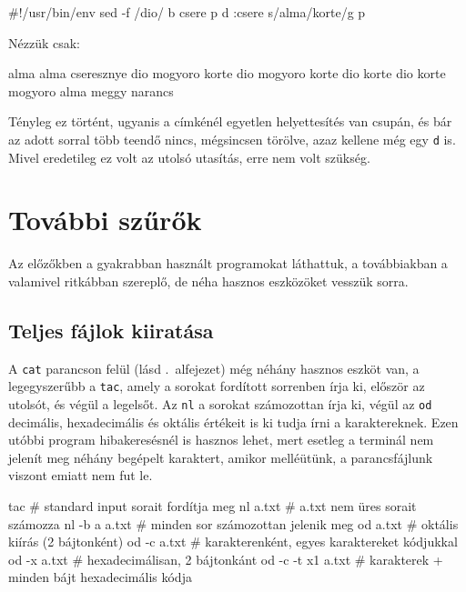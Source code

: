 \begin{VerbExample}
#!/usr/bin/env sed -f
/dio/ b csere
p
d
:csere
{ s/alma/korte/g }
p
\end{VerbExample}

\noindent Nézzük csak:

\begin{VerbExample}
alma alma cseresznye
dio mogyoro korte
dio mogyoro korte
dio korte
dio korte
mogyoro alma meggy narancs
\end{VerbExample}

\noindent Tényleg ez történt, ugyanis a címkénél egyetlen helyettesítés van
csupán, és bár az adott sorral több teendő nincs, mégsincsen törölve, azaz
kellene még egy \texttt{d} is. Mivel eredetileg ez volt az utolsó utasítás, erre
nem volt szükség.



\section{További szűrők}
\label{sec:filters-others}

Az előzőkben a gyakrabban használt programokat láthattuk, a továbbiakban a
valamivel ritkábban szereplő, de néha hasznos eszközöket vesszük sorra.



\subsection{Teljes fájlok kiiratása}

A \texttt{cat} parancson felül (lásd .\ alfejezet) még
néhány hasznos eszköt van, a legegyszerűbb a \texttt{tac}, amely a sorokat
fordított sorrenben írja ki, először az utolsót, és végül a legelsőt. Az
\texttt{nl} a sorokat számozottan írja ki, végül az \texttt{od} decimális,
hexadecimális és oktális értékeit is ki tudja írni a karaktereknek. Ezen utóbbi
program hibakeresésnél is hasznos lehet, mert esetleg a terminál nem jelenít meg
néhány begépelt karaktert, amikor melléütünk, a parancsfájlunk viszont emiatt
nem fut le.

\begin{VerbExample}
tac               # standard input sorait fordítja meg
nl a.txt          # a.txt nem üres sorait számozza
nl -b a a.txt     # minden sor számozottan jelenik meg
od a.txt          # oktális kiírás (2 bájtonként)
od -c a.txt       # karakterenként, egyes karaktereket kódjukkal
od -x a.txt       # hexadecimálisan, 2 bájtonkánt
od -c -t x1 a.txt # karakterek + minden bájt hexadecimális kódja
\end{VerbExample}


